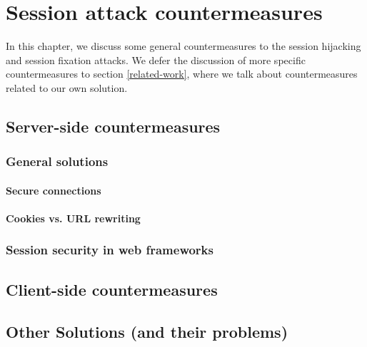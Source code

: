 \chapter{Session attack countermeasures}

In this chapter, we discuss some general countermeasures to the session hijacking and session fixation attacks. We defer the discussion of more specific countermeasures to section \ref{related-work}, where we talk about countermeasures related to our own solution. %

\section{Server-side countermeasures}

\subsection{General solutions}

\subsubsection{Secure connections}\label{ssl}\label{httponly}

\subsubsection{Cookies vs. URL rewriting}\label{url-vs-cookies}

\subsection{Session security in web frameworks}\label{frameworks}

\section{Client-side countermeasures}

\section{Other Solutions (and their problems)}\label{other-solutions}

\label{xss-countermeasures}
